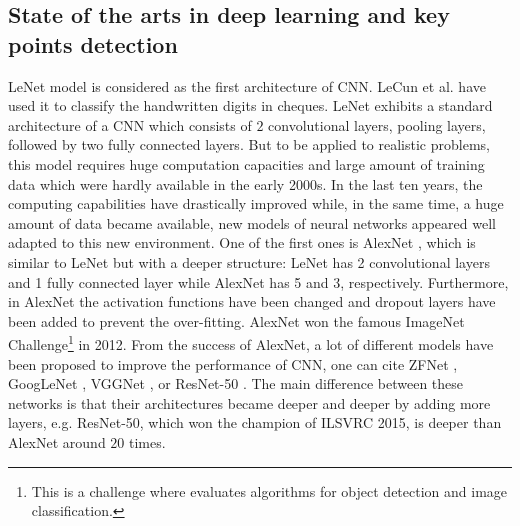 \documentclass[review]{elsarticle}
\begin{document}
\subsection{State of the arts in deep learning and key points detection}
LeNet \cite{lecun1998gradient} model is considered as the first architecture of CNN. LeCun et al. \cite{lecun1998gradient} have used it to classify the handwritten digits in cheques. LeNet exhibits a standard architecture of a CNN which consists of $2$ convolutional layers, pooling layers, followed by two fully connected layers. But to be applied to realistic problems, this model requires huge computation capacities and large amount of training data which were hardly available in the early 2000s. In the last ten years, the computing capabilities have drastically improved while, in the same time, a huge amount of data became available, new models of neural networks appeared well adapted to this new environment. One of the first ones is AlexNet \cite{krizhevsky2012imagenet}, which is similar to LeNet \cite{lecun1998gradient} but with a deeper structure: LeNet has 2 convolutional layers and 1 fully connected layer while AlexNet has 5 and 3, respectively. Furthermore, in AlexNet the activation functions have been changed and dropout layers have been added to prevent the over-fitting. AlexNet won the famous ImageNet Challenge\footnote{This is a challenge where evaluates algorithms for object detection and image classification.} in 2012. From the success of AlexNet, a lot of different models have been proposed to improve the performance of CNN, one can cite ZFNet  \cite{zeiler2014visualizing}, GoogLeNet \cite{szegedy2015going}, VGGNet \cite{simonyan2014very}, or ResNet-50 \cite{he2016deep}. The main difference between these networks is that their architectures became deeper and deeper by adding more layers, e.g. ResNet-50, which won the champion of ILSVRC 2015, is deeper than AlexNet around $20$ times.
 
\end{document}
